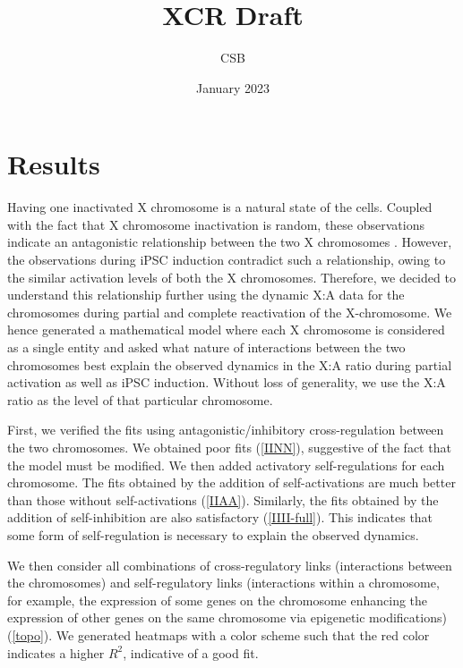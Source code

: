 \documentclass[11pt,a4paper]{article}
\title{XCR Draft}
\author{CSB}
\date{January 2023}
\renewcommand{\cite}{\parencite}
\begin{document}
\maketitle

\section{Results}

Having one inactivated X chromosome is a natural state of the cells. Coupled with the fact that X chromosome inactivation is random, these observations indicate an antagonistic relationship between the two X chromosomes \cite{XCI-TS}. However, the observations during iPSC induction contradict such a relationship, owing to the similar activation levels of both the X chromosomes. Therefore, we decided to understand this relationship further using the dynamic X:A data for the chromosomes during partial and complete reactivation of the X-chromosome. We hence generated a mathematical model where each X chromosome is considered as a single entity and asked what nature of interactions between the two chromosomes best explain the observed dynamics in the X:A ratio during partial activation as well as iPSC induction. Without loss of generality, we use the X:A ratio as the level of that particular chromosome.

First, we verified the fits using antagonistic/inhibitory cross-regulation between the two chromosomes. We obtained poor fits (\autoref{IINN}), suggestive of the fact that the model must be modified. We then added activatory self-regulations for each chromosome. The fits obtained by the addition of self-activations are much better than those without self-activations (\autoref{IIAA}). Similarly, the fits obtained by the addition of self-inhibition are also satisfactory (\autoref{IIII-full}). This indicates that some form of self-regulation is necessary to explain the observed dynamics.

We then consider all combinations of cross-regulatory links (interactions between the chromosomes) and self-regulatory links (interactions within a chromosome, for example, the expression of some genes on the chromosome enhancing the expression of other genes on the same chromosome via epigenetic modifications) (\autoref{topo}). We generated heatmaps with a color scheme such that the red color indicates a higher $R^2$, indicative of a good fit.
\end{document}
